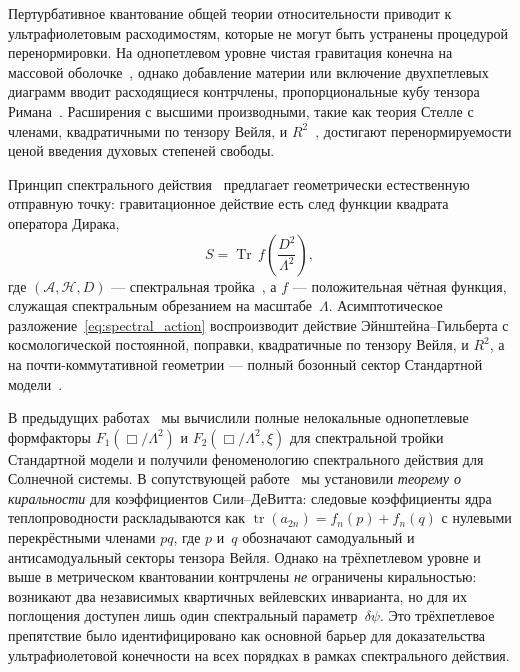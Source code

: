 \documentclass[12pt,a4paper]{article}
\theoremstyle{definition}
\theoremstyle{remark}
\newcommand{\Tr}{\operatorname{Tr}}
\newcommand{\tr}{\operatorname{tr}}
\newcommand{\Lam}{\Lambda}
\newcommand{\Hilb}{\mathcal{H}}
\newcommand{\Alg}{\mathcal{A}}
\begin{document}
Пертурбативное квантование общей теории относительности приводит к
ультрафиолетовым расходимостям, которые не могут быть устранены
процедурой перенормировки.
На однопетлевом уровне чистая гравитация конечна на массовой
оболочке~\cite{tHooftVeltman:1974}, однако добавление материи или
включение двухпетлевых диаграмм вводит расходящиеся контрчлены,
пропорциональные кубу тензора
Римана~\cite{Goroff:1985th, vandeVen:1992gw}.  Расширения с высшими
производными, такие как теория Стелле с членами, квадратичными по
тензору Вейля, и $R^2$~\cite{Stelle:1976gc}, достигают
перенормируемости ценой введения духовых степеней свободы.

Принцип спектрального действия~\cite{Chamseddine:1996zu, Chamseddine:2006ep}
предлагает геометрически естественную отправную точку: гравитационное
действие есть след функции квадрата оператора Дирака,
\begin{equation}\label{eq:spectral_action}
  S = \Tr\,f\!\left(\frac{D^2}{\Lam^2}\right),
\end{equation}
где $(\Alg, \Hilb, D)$ --- спектральная тройка~\cite{Connes:1994book,
Connes:1995cr}, а $f$ --- положительная чётная функция, служащая
спектральным обрезанием на масштабе~$\Lam$.  Асимптотическое
разложение~\eqref{eq:spectral_action} воспроизводит действие
Эйнштейна--Гильберта с космологической постоянной, поправки,
квадратичные по тензору Вейля, и $R^2$, а на почти-коммутативной
геометрии --- полный бозонный сектор Стандартной
модели~\cite{Chamseddine:2010ud, vanSuijlekom:2014pya}.

В предыдущих работах~\cite{Alfyorov:2026ff, Alfyorov:2026ss} мы
вычислили полные нелокальные однопетлевые формфакторы
$F_1(\Box/\Lam^2)$ и $F_2(\Box/\Lam^2, \xi)$ для спектральной тройки
Стандартной модели и получили феноменологию спектрального действия для
Солнечной системы.  В сопутствующей работе~\cite{Alfyorov:2026ct} мы
установили \emph{теорему о киральности} для коэффициентов
Сили--ДеВитта: следовые коэффициенты ядра теплопроводности
раскладываются как $\tr(a_{2n}) = f_n(p) + f_n(q)$ с нулевыми
перекрёстными членами $pq$, где $p$ и~$q$ обозначают самодуальный и
антисамодуальный секторы тензора Вейля.  Однако на трёхпетлевом уровне
и выше в метрическом квантовании контрчлены \emph{не} ограничены
киральностью: возникают два независимых квартичных вейлевских
инварианта, но для их поглощения доступен лишь один спектральный
параметр~$\delta\psi$.  Это трёхпетлевое препятствие было
идентифицировано как основной барьер для доказательства
ультрафиолетовой конечности на всех порядках в рамках спектрального
действия.
\end{document}
